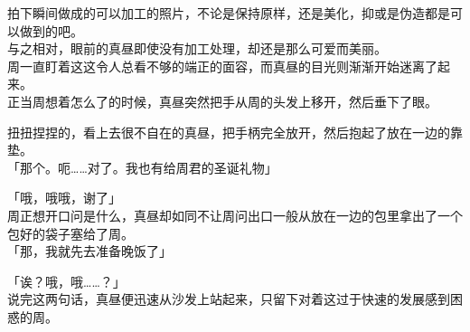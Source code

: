 拍下瞬间做成的可以加工的照片，不论是保持原样，还是美化，抑或是伪造都是可以做到的吧。\\

与之相对，眼前的真昼即使没有加工处理，却还是那么可爱而美丽。\\

周一直盯着这这令人总看不够的端正的面容，而真昼的目光则渐渐开始迷离了起来。\\

正当周想着怎么了的时候，真昼突然把手从周的头发上移开，然后垂下了眼。

扭扭捏捏的，看上去很不自在的真昼，把手柄完全放开，然后抱起了放在一边的靠垫。\\

「那个。呃……对了。我也有给周君的圣诞礼物」

「哦，哦哦，谢了」\\

周正想开口问是什么，真昼却如同不让周问出口一般从放在一边的包里拿出了一个包好的袋子塞给了周。\\

「那，我就先去准备晚饭了」

「诶？哦，哦……？」\\

说完这两句话，真昼便迅速从沙发上站起来，只留下对着这过于快速的发展感到困惑的周。


